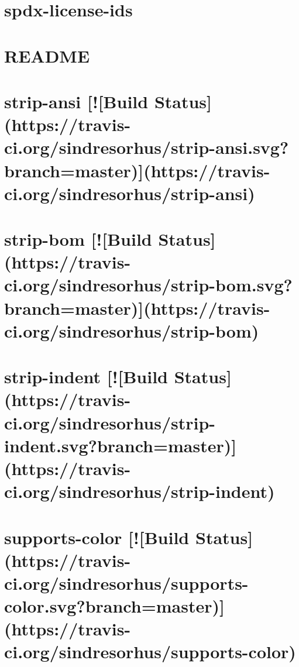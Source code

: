 \documentclass[twoside]{book}
\newcommand{\+}{\discretionary{\mbox{\scriptsize$\hookleftarrow$}}{}{}}
\begin{document}
\chapter{spdx-\/license-\/ids}
\label{md_app_web_node_modules_spdx-license-ids__r_e_a_d_m_e}

\chapter{R\+E\+A\+D\+ME}
\label{md_app_web_node_modules_string_decoder__r_e_a_d_m_e}

\chapter{strip-\/ansi \mbox{[}!\mbox{[}Build Status\mbox{]}(https\+://travis-\/ci.org/sindresorhus/strip-\/ansi.svg?branch=master)\mbox{]}(https\+://travis-\/ci.org/sindresorhus/strip-\/ansi)}
\label{md_app_web_node_modules_strip-ansi_readme}

\chapter{strip-\/bom \mbox{[}!\mbox{[}Build Status\mbox{]}(https\+://travis-\/ci.org/sindresorhus/strip-\/bom.svg?branch=master)\mbox{]}(https\+://travis-\/ci.org/sindresorhus/strip-\/bom)}
\label{md_app_web_node_modules_strip-bom_readme}

\chapter{strip-\/indent \mbox{[}!\mbox{[}Build Status\mbox{]}(https\+://travis-\/ci.org/sindresorhus/strip-\/indent.svg?branch=master)\mbox{]}(https\+://travis-\/ci.org/sindresorhus/strip-\/indent)}
\label{md_app_web_node_modules_strip-indent_readme}

\chapter{supports-\/color \mbox{[}!\mbox{[}Build Status\mbox{]}(https\+://travis-\/ci.org/sindresorhus/supports-\/color.svg?branch=master)\mbox{]}(https\+://travis-\/ci.org/sindresorhus/supports-\/color)}
\label{md_app_web_node_modules_supports-color_readme}

\end{document}
